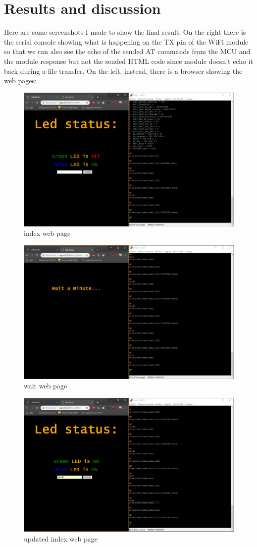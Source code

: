 \documentclass[peerreview]{IEEEtran}
\begin{document}
\section{Results and discussion} 
Here are some screenshots I made to show the final result. On the right there is the serial console showing what is happening on the TX pin of the WiFi module so that we can also see the echo of the sended AT commands from the MCU and the module response but not the sended HTML code since module doesn't echo it back during a file transfer. On the left, instead, there is a browser showing the web pages:
\begin{figure}[!h]
\centering
\includegraphics[width=0.8\columnwidth]{1}
\caption{index web page}
\label{fig_index}
\end{figure}
\begin{figure}[!h]
\centering
\includegraphics[width=0.8\columnwidth]{2}
\caption{wait web page}
\label{fig_wait}
\end{figure}
\begin{figure}[!h]
\centering
\includegraphics[width=0.8\columnwidth]{3}
\caption{updated index web page}
\label{fig_updated}
\end{figure}
\end{document}
